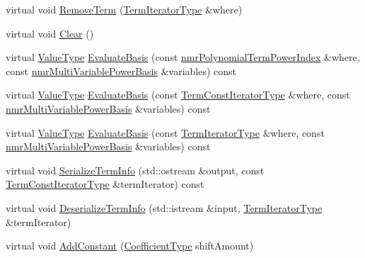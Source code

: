 \begin{DoxyCompactItemize}
virtual void \hyperlink{classnmr_bernstein_polynomial_a615e825f6b2c453fa48bf50b387af9bb}{Remove\+Term} (\hyperlink{classnmr_polynomial_container_a276e57445d038e8a16462f47b85719a3}{Term\+Iterator\+Type} \&where)
\item 
virtual void \hyperlink{classnmr_bernstein_polynomial_a7987a19a4cccb2dac54ffee7b77492fb}{Clear} ()
\item 
virtual \hyperlink{classnmr_polynomial_base_a72f0bc16b225e4708bcf15a77ba206e3}{Value\+Type} \hyperlink{classnmr_bernstein_polynomial_a2e259ce60fe4ba4e18649a366e4f90a9}{Evaluate\+Basis} (const \hyperlink{classnmr_polynomial_term_power_index}{nmr\+Polynomial\+Term\+Power\+Index} \&where, const \hyperlink{classnmr_multi_variable_power_basis}{nmr\+Multi\+Variable\+Power\+Basis} \&variables) const 
\item 
virtual \hyperlink{classnmr_polynomial_base_a72f0bc16b225e4708bcf15a77ba206e3}{Value\+Type} \hyperlink{classnmr_bernstein_polynomial_aa47f112a93af89b894da0808171fe168}{Evaluate\+Basis} (const \hyperlink{classnmr_polynomial_container_aba8d31506ab6a487fdc4fe2815469442}{Term\+Const\+Iterator\+Type} \&where, const \hyperlink{classnmr_multi_variable_power_basis}{nmr\+Multi\+Variable\+Power\+Basis} \&variables) const 
\item 
virtual \hyperlink{classnmr_polynomial_base_a72f0bc16b225e4708bcf15a77ba206e3}{Value\+Type} \hyperlink{classnmr_bernstein_polynomial_a655a3b41ac928510914e202332fe54b2}{Evaluate\+Basis} (const \hyperlink{classnmr_polynomial_container_a276e57445d038e8a16462f47b85719a3}{Term\+Iterator\+Type} \&where, const \hyperlink{classnmr_multi_variable_power_basis}{nmr\+Multi\+Variable\+Power\+Basis} \&variables) const 
\item 
virtual void \hyperlink{classnmr_bernstein_polynomial_ab8846bb7223b02b87c366672d4a07a4f}{Serialize\+Term\+Info} (std\+::ostream \&output, const \hyperlink{classnmr_polynomial_container_aba8d31506ab6a487fdc4fe2815469442}{Term\+Const\+Iterator\+Type} \&term\+Iterator) const 
\item 
virtual void \hyperlink{classnmr_bernstein_polynomial_a457024b5819f590ef4a9feb1b803a796}{Deserialize\+Term\+Info} (std\+::istream \&input, \hyperlink{classnmr_polynomial_container_a276e57445d038e8a16462f47b85719a3}{Term\+Iterator\+Type} \&term\+Iterator)
\item 
virtual void \hyperlink{classnmr_bernstein_polynomial_aea0de386d6fba42e5ff2c36d5412b25e}{Add\+Constant} (\hyperlink{classnmr_polynomial_base_a8693efdfc8585ccb49abea69f74f3eef}{Coefficient\+Type} shift\+Amount)

\end{DoxyCompactItemize}
